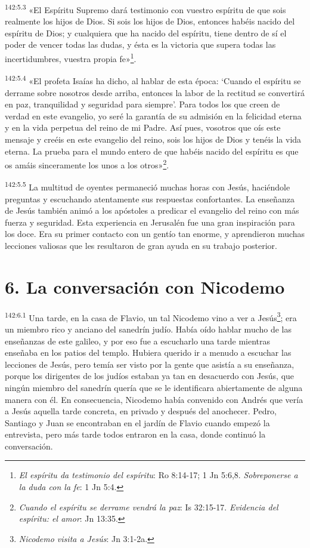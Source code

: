 \par
\textsuperscript{142:5.3} «El Espíritu Supremo dará testimonio con vuestro espíritu de que sois realmente los hijos de Dios. Si sois los hijos de Dios, entonces habéis nacido del espíritu de Dios; y cualquiera que ha nacido del espíritu, tiene dentro de sí el poder de vencer todas las dudas, y ésta es la victoria que supera todas las incertidumbres, vuestra propia fe»\footnote{\textit{El espíritu da testimonio del espíritu}: Ro 8:14-17; 1 Jn 5:6,8. \textit{Sobreponerse a la duda con la fe}: 1 Jn 5:4.}.

\par
\textsuperscript{142:5.4} «El profeta Isaías ha dicho, al hablar de esta época: `Cuando el espíritu se derrame sobre nosotros desde arriba, entonces la labor de la rectitud se convertirá en paz, tranquilidad y seguridad para siempre'. Para todos los que creen de verdad en este evangelio, yo seré la garantía de su admisión en la felicidad eterna y en la vida perpetua del reino de mi Padre. Así pues, vosotros que oís este mensaje y creéis en este evangelio del reino, sois los hijos de Dios y tenéis la vida eterna. La prueba para el mundo entero de que habéis nacido del espíritu es que os amáis sinceramente los unos a los otros»\footnote{\textit{Cuando el espíritu se derrame vendrá la paz}: Is 32:15-17. \textit{Evidencia del espíritu: el amor}: Jn 13:35.}.

\par
\textsuperscript{142:5.5} La multitud de oyentes permaneció muchas horas con Jesús, haciéndole preguntas y escuchando atentamente sus respuestas confortantes. La enseñanza de Jesús también animó a los apóstoles a predicar el evangelio del reino con más fuerza y seguridad. Esta experiencia en Jerusalén fue una gran inspiración para los doce. Era su primer contacto con un gentío tan enorme, y aprendieron muchas lecciones valiosas que les resultaron de gran ayuda en su trabajo posterior.

\section*{6. La conversación con Nicodemo}
\par
\textsuperscript{142:6.1} Una tarde, en la casa de Flavio, un tal Nicodemo vino a ver a Jesús\footnote{\textit{Nicodemo visita a Jesús}: Jn 3:1-2a.}; era un miembro rico y anciano del sanedrín judío. Había oído hablar mucho de las enseñanzas de este galileo, y por eso fue a escucharlo una tarde mientras enseñaba en los patios del templo. Hubiera querido ir a menudo a escuchar las lecciones de Jesús, pero temía ser visto por la gente que asistía a su enseñanza, porque los dirigentes de los judíos estaban ya tan en desacuerdo con Jesús, que ningún miembro del sanedrín quería que se le identificara abiertamente de alguna manera con él. En consecuencia, Nicodemo había convenido con Andrés que vería a Jesús aquella tarde concreta, en privado y después del anochecer. Pedro, Santiago y Juan se encontraban en el jardín de Flavio cuando empezó la entrevista, pero más tarde todos entraron en la casa, donde continuó la conversación.

